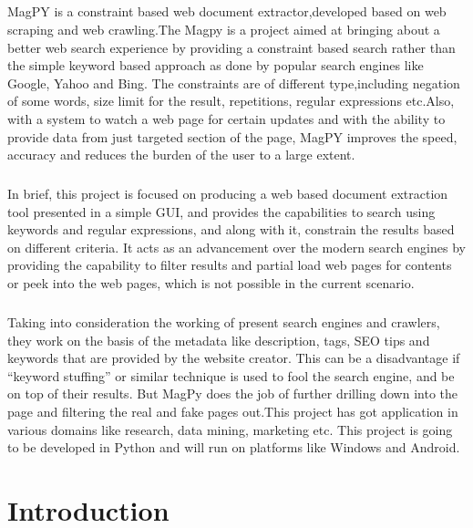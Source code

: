 \documentclass[a4paper]{report}
\begin{document}
\paragraph{}
\large\textnormal{MagPY is a constraint based web document extractor,developed based on web scraping and web crawling.The Magpy is a project aimed at bringing about a better web search experience by providing a constraint based search rather than the simple keyword based approach as done by popular search engines like Google, Yahoo and Bing. The constraints are of different type,including negation of some words, size limit for the result, repetitions, regular expressions etc.Also, with a system to watch a web page for certain updates and with the ability to provide data from just targeted section of the page, MagPY improves the speed, accuracy and reduces the burden of the user to a large extent. }
\paragraph{}
\large\textnormal{In brief, this project is focused on producing a web based document extraction tool presented in a simple GUI, and provides the capabilities to search using keywords and regular expressions, and along with it, constrain the results based on different criteria. It acts as an advancement over the modern search engines by providing the capability to filter results and partial load web pages for contents or peek into the web pages, which is not possible in the current scenario.}
\paragraph{}
\large\textnormal{Taking into consideration the working of present search engines and crawlers, they work on the basis of the metadata like description, tags, SEO tips and keywords that are provided by the website creator. This can be a disadvantage if “keyword stuffing” or similar technique is used to fool the search engine, and be on top of their results. But MagPy does the job of further drilling down into the page and filtering the real and fake pages out.This project has got application in various domains like research, data mining, marketing etc. This project is going to be developed in Python and will run on platforms like Windows and Android.}

\newpage
{}
\setcounter{page}{1}
\chapter{Introduction}
\end{document}
